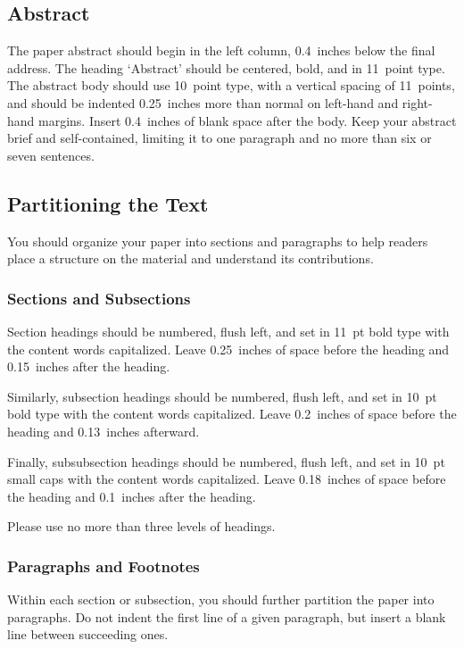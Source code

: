 \documentclass{article}
\begin{document}
\subsection{Abstract}

The paper abstract should begin in the left column, 0.4~inches below
the final address. The heading `Abstract' should be centered, bold,
and in 11~point type. The abstract body should use 10~point type, with
a vertical spacing of 11~points, and should be indented 0.25~inches
more than normal on left-hand and right-hand margins. Insert
0.4~inches of blank space after the body. Keep your abstract brief and self-contained,
limiting it to one paragraph and no more than six or seven sentences.

\subsection{Partitioning the Text} 

You should organize your paper into sections and paragraphs to help
readers place a structure on the material and understand its
contributions.

\subsubsection{Sections and Subsections}

Section headings should be numbered, flush left, and set in 11~pt bold
type with the content words capitalized. Leave 0.25~inches of space
before the heading and 0.15~inches after the heading.

Similarly, subsection headings should be numbered, flush left, and set
in 10~pt bold type with the content words capitalized. Leave
0.2~inches of space before the heading and 0.13~inches afterward.

Finally, subsubsection headings should be numbered, flush left, and
set in 10~pt small caps with the content words capitalized. Leave
0.18~inches of space before the heading and 0.1~inches after the
heading. 

Please use no more than three levels of headings.

\subsubsection{Paragraphs and Footnotes}

Within each section or subsection, you should further partition the
paper into paragraphs. Do not indent the first line of a given
paragraph, but insert a blank line between succeeding ones.
 
\end{document}
